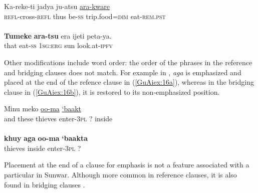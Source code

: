 \documentclass[output=paper]{LSP/langsci}
\begin{document}
\begin{exe}
\ex \label{GuAiex:15ab}
\begin{xlist}
\ex \label{GuAiex:15a}
\gll Ka-reke-ti      jadya   ju-atsu   \underline{}   \underline{ara-kware}\\
\textsc{refl}-cross-\textsc{refl}   thus   be-\textsc{ss}     trip.food=\textsc{dim}   eat-\textsc{rem.pst}\\
\glt {}\\
\ex \label{GuAiex:15b}
\gll \textbf{Tumeke} \textbf{ara-tsu} era     ijeti   peta-ya. \\
that     eat-\textsc{ss}     \textsc{1sg:erg}   sun   look.at-\textsc{ipfv}  \\
\glt {}
\end{xlist}
\end{exe}


Other modifications include word order: the order of the phrases in the reference and bridging clauses does not match. For example in , \textit{aga} is emphasized and placed at the end of the refence clause in (\ref{GuAiex:16a}), whereas in the bridging clause in (\ref{GuAiex:16b}), it is restored to its non-emphasized position.


\begin{exe}
\ex \label{GuAiex:16ab}
\begin{xlist}
\ex \label{GuAiex:16a}
\gll Minu   meko  \underline{}     \underline{oo-ma}     \underline{‘baakt}   \underline{}\\
and   these   thieves   enter-\textsc{3pl}   ?  inside\\
\glt {} \\
\ex \label{GuAiex:16b}
\gll \textbf{khuy}     \textbf{aga}     \textbf{oo-ma }    \textbf{‘baakta} \\
thieves   inside     enter-\textsc{3pl}   ? \\
\glt {}
\end{xlist}
\end{exe}

\noindent
Placement at the end of a clause for emphasis is not a feature associated with a particular  in Sunwar. Although more common in reference clauses, it is also found in bridging clauses \citep[][391]{schulze73}. 
\end{document}
